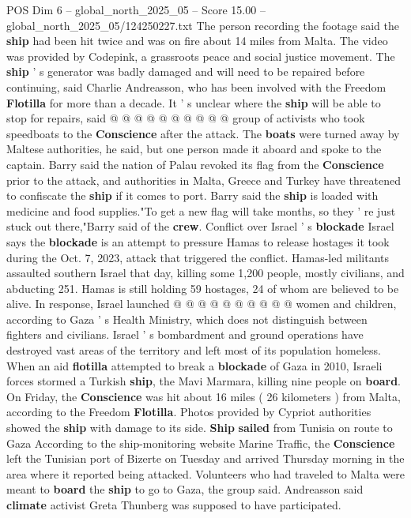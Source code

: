 \begin{textsample}{POS Dim 6 – global\_north\_2025\_05 – Score 15.00 – global\_north\_2025\_05/124250227.txt}
The person recording the footage said the \textbf{ship} had been hit twice and was on fire about 14 miles from Malta.
The video was provided by Codepink, a grassroots peace and social justice movement.
The \textbf{ship} ' s generator was badly damaged and will need to be repaired before continuing, said Charlie Andreasson, who has been involved with the Freedom \textbf{Flotilla} for more than a decade.
It ' s unclear where the \textbf{ship} will be able to stop for repairs, said @ @ @ @ @ @ @ @ @ @ group of activists who took speedboats to the \textbf{Conscience} after the attack.
The \textbf{boats} were turned away by Maltese authorities, he said, but one person made it aboard and spoke to the captain.
Barry said the nation of Palau revoked its flag from the \textbf{Conscience} prior to the attack, and authorities in Malta, Greece and Turkey have threatened to confiscate the \textbf{ship} if it comes to port.
Barry said the \textbf{ship} is loaded with medicine and food supplies."To get a new flag will take months, so they ' re just stuck out there,"Barry said of the \textbf{crew}.
Conflict over Israel ' s \textbf{blockade} Israel says the \textbf{blockade} is an attempt to pressure Hamas to release hostages it took during the Oct. 7, 2023, attack that triggered the conflict.
Hamas-led militants assaulted southern Israel that day, killing some 1,200 people, mostly civilians, and abducting 251.
Hamas is still holding 59 hostages, 24 of whom are believed to be alive.
In response, Israel launched @ @ @ @ @ @ @ @ @ @ women and children, according to Gaza ' s Health Ministry, which does not distinguish between fighters and civilians.
Israel ' s bombardment and ground operations have destroyed vast areas of the territory and left most of its population homeless.
When an aid \textbf{flotilla} attempted to break a \textbf{blockade} of Gaza in 2010, Israeli forces stormed a Turkish \textbf{ship}, the Mavi Marmara, killing nine people on \textbf{board}.
On Friday, the \textbf{Conscience} was hit about 16 miles ( 26 kilometers ) from Malta, according to the Freedom \textbf{Flotilla}.
Photos provided by Cypriot authorities showed the \textbf{ship} with damage to its side. \textbf{Ship} \textbf{sailed} from Tunisia on route to Gaza According to the ship-monitoring website Marine Traffic, the \textbf{Conscience} left the Tunisian port of Bizerte on Tuesday and arrived Thursday morning in the area where it reported being attacked.
Volunteers who had traveled to Malta were meant to \textbf{board} the \textbf{ship} to go to Gaza, the group said.
Andreasson said \textbf{climate} activist Greta Thunberg was supposed to have participated.

\end{textsample}
